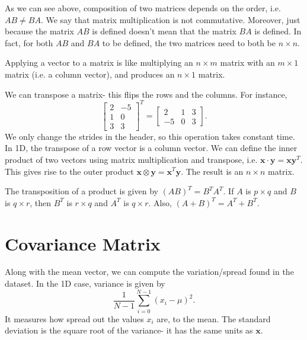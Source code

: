 \documentclass[a4paper, openany]{memoir}
\begin{document}
    As we can see above, composition of two matrices depends on the order, i.e. $AB \neq BA$. We say that matrix multiplication is not commutative. Moreover, just because the matrix $AB$ is defined doesn't mean that the matrix $BA$ is defined. In fact, for both $AB$ and $BA$ to be defined, the two matrices need to both be $n \times n$.

    Applying a vector to a matrix is like multiplying an $n \times m$ matrix with an $m \times 1$ matrix (i.e. a column vector), and produces an $n \times 1$ matrix.

    We can transpose a matrix- this flips the rows and the columns. For instance,
    \[\begin{bmatrix}
        2 & -5 \\
        1 & 0 \\
        3 & 3
    \end{bmatrix}^T = \begin{bmatrix}
        2 & 1 & 3 \\
        -5 & 0 & 3
    \end{bmatrix}.\]
    We only change the strides in the header, so this operation takes constant time. In 1D, the transpose of a row vector is a column vector. We can define the inner product of two vectors using matrix multiplication and transpose, i.e. $\mathbf{x} \cdot \mathbf{y} = \mathbf{x}\mathbf{y}^T$. This gives rise to the outer product $\mathbf{x} \otimes \mathbf{y} = \mathbf{x}^T \mathbf{y}$. The result is an $n \times n$ matrix.

    The transposition of a product is given by $(AB)^T = B^T A^T$. If $A$ is $p \times q$ and $B$ is $q \times r$, then $B^T$ is $r \times q$ and $A^T$ is $q \times r$. Also, $(A + B)^T = A^T + B^T$.

    \section{Covariance Matrix}
    Along with the mean vector, we can compute the variation/spread found in the dataset. In the 1D case, variance is given by
    \[\frac{1}{N-1} \sum_{i=0}^{N-1} (x_i - \mu)^2.\]
    It measures how spread out the values $x_i$ are, to the mean. The standard deviation is the square root of the variance- it has the same units as $\mathbf{x}$.
\end{document}
